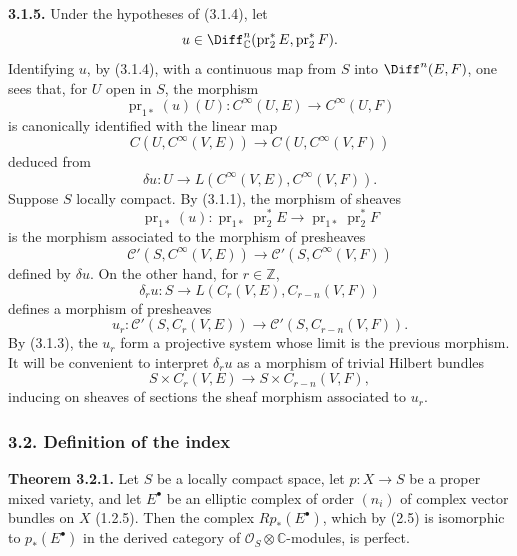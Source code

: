 \textbf{3.1.5.} Under the hypotheses of (3.1.4), let
\[
 u\in\Diff^n_{\mathbb C}(\operatorname{pr}_2^*E,\operatorname{pr}_2^*F).
\]
Identifying $u$, by (3.1.4), with a continuous map from $S$ into $\Diff^n(E,F)$, one sees that, for $U$ open in $S$, the morphism
\[
 \operatorname{pr}_{1*}(u)(U):C^\infty(U,E)\longrightarrow C^\infty(U,F)
\]
is canonically identified with the linear map
\[
 C(U,C^\infty(V,E))\longrightarrow C(U,C^\infty(V,F))
\]
deduced from
\[
 \delta u:U\longrightarrow L(C^\infty(V,E),C^\infty(V,F)).
\]
Suppose $S$ locally compact. By (3.1.1), the morphism of sheaves
\[
 \operatorname{pr}_{1*}(u):
 \operatorname{pr}_{1*}\operatorname{pr}_2^*E
 \longrightarrow
 \operatorname{pr}_{1*}\operatorname{pr}_2^*F
\]
is the morphism associated to the morphism of presheaves
\[
 \mathcal C'(S,C^\infty(V,E))\longrightarrow \mathcal C'(S,C^\infty(V,F))
\]
defined by $\delta u$. On the other hand, for $r\in\mathbb Z$,
\[
 \delta_r u:S\longrightarrow L(C_r(V,E),C_{r-n}(V,F))
\]
defines a morphism of presheaves
\[
 u_r:\mathcal C'(S,C_r(V,E))\longrightarrow \mathcal C'(S,C_{r-n}(V,F)).
\]
By (3.1.3), the $u_r$ form a projective system whose limit is the previous morphism. It will be convenient to interpret $\delta_r u$ as a morphism of trivial Hilbert bundles
\[
 S\times C_r(V,E)\longrightarrow S\times C_{r-n}(V,F),
\]
inducing on sheaves of sections the sheaf morphism associated to $u_r$.

\subsubsection*{3.2. Definition of the index}

\textbf{Theorem 3.2.1.} Let $S$ be a locally compact space, let $p:X\to S$ be a proper mixed variety, and let $E^\bullet$ be an elliptic complex of order $(n_i)$ of complex vector bundles on $X$ (1.2.5). Then the complex $Rp_*(E^\bullet)$, which by (2.5) is isomorphic to $p_*(E^\bullet)$ in the derived category of $\mathcal O_S\otimes\mathbb C$-modules, is perfect.

